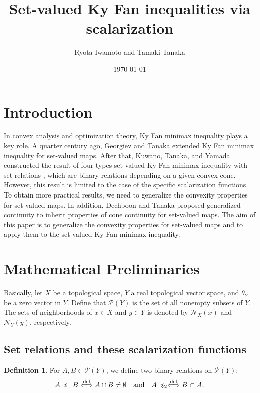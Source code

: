 \documentclass[a4paper,11pt]{jsarticle}
\theoremstyle{definition}
\newtheorem{dfn}[thm]{Definition}
\begin{document}
\title{%
  Set-valued Ky Fan inequalities via scalarization}
\author{Ryota Iwamoto and Tamaki Tanaka}
\date{\today}
\maketitle

\section{Introduction}
In convex analysis and optimization theory, Ky Fan minimax inequality plays a key role. A quarter century ago, Georgiev and Tanaka \cite{GeorgievTanaka2000, GeorgievTanaka2001}
extended Ky Fan minimax inequality for set-valued maps. After that, Kuwano, Tanaka, and Yamada \cite{KuwanoTanakaYamada2010} constructed the result of four types set-valued Ky Fan minimax inequality
with set relations \cite{KuroiwaTanakaHa1997}, which are binary relations depending on a given convex cone. However, this result is limited to the case of the specific scalarization functions. To obtain more practical results,
we need to generalize the convexity properties for set-valued maps. In addition, Dechboon and Tanaka \cite{DechboonTanaka2024} proposed generalized continuity to inherit properties of cone continuity for set-valued maps.
The aim of this paper is to generalize the convexity properties for set-valued maps and to apply them to the set-valued Ky Fan minimax inequality.

\section{Mathematical Preliminaries}

Basically, let $X$ be a topological space, $Y$ a real topological vector space, and $\theta_Y$ be a zero vector in $Y$.
Define that $\mathcal{P}(Y)$ is the set of all nonempty subsets of $Y$. The sets of neighborhoods of $x \in X$ and $y \in Y$ is denoted by $\mathcal{N}_X (x)$ and $\mathcal{N}_Y (y)$, respectively.

\subsection{Set relations and these scalarization functions}

\begin{dfn}
  For $A,B \in \mathcal{P}(Y)$, we define two binary relations on $\mathcal{P}(Y)$:
  \begin{equation}
    A \preccurlyeq_1 B \overset{\text{def}}{\Longleftrightarrow} A \cap B \ne \emptyset \quad \text{and} \quad A \preccurlyeq_2 \overset{\text{def}}{\Longleftrightarrow} B \subset A. \notag
  \end{equation}
\end{dfn}
\end{document}
